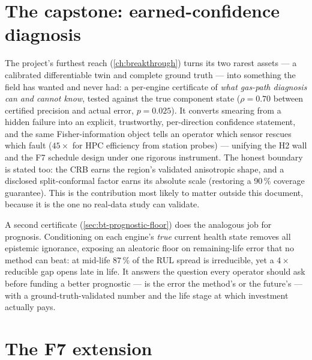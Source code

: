 \section{The capstone: earned-confidence diagnosis}

The project's furthest reach (\cref{ch:breakthrough}) turns its two rarest assets --- a
calibrated differentiable twin and complete ground truth --- into something the field has
wanted and never had: a per-engine certificate of \emph{what gas-path diagnosis can and
cannot know}, tested against the true component state ($\rho = 0.70$ between certified
precision and actual error, $p = 0.025$). It converts smearing from a hidden failure into an
explicit, trustworthy, per-direction confidence statement, and the same Fisher-information
object tells an operator which sensor rescues which fault ($45\times$ for HPC efficiency
from station probes) --- unifying the H2 wall and the F7 schedule design under one rigorous
instrument. The honest boundary is stated too: the CRB earns the region's validated anisotropic shape,
and a disclosed split-conformal factor earns its absolute scale (restoring a 90\,\% coverage
guarantee). This is the contribution most likely to matter outside
this document, because it is the one no real-data study can validate.

A second certificate (\cref{sec:bt-prognostic-floor}) does the analogous job for prognosis.
Conditioning on each engine's \emph{true} current health state removes all epistemic
ignorance, exposing an aleatoric floor on remaining-life error that no method can beat: at
mid-life $87\,\%$ of the RUL spread is irreducible, yet a $4\times$ reducible gap opens late
in life. It answers the question every operator should ask before funding a better prognostic
--- is the error the method's or the future's --- with a ground-truth-validated number and the
life stage at which investment actually pays.

\section{The F7 extension}

